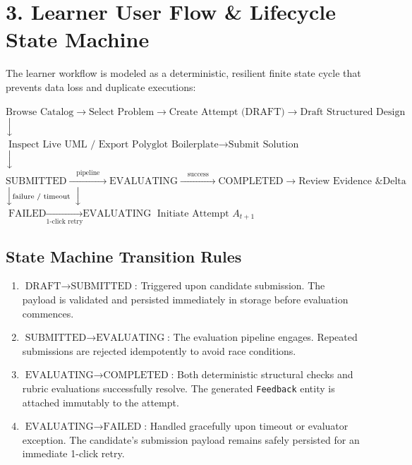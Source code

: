 \documentclass[10pt,a4paper]{article}
\begin{document}
\section{3. Learner User Flow \& Lifecycle State Machine}

The learner workflow is modeled as a deterministic, resilient finite state cycle that prevents data loss and duplicate executions:

\begin{center}
$\text{Browse Catalog} \longrightarrow \text{Select Problem} \longrightarrow \text{Create Attempt (DRAFT)} \longrightarrow \text{Draft Structured Design}$ \\[0.3em]
$\Big\downarrow$ \\[0.3em]
$\text{Inspect Live UML / Export Polyglot Boilerplate} \longrightarrow \text{Submit Solution}$ \\[0.3em]
$\Big\downarrow$ \\[0.3em]
$\boxed{\text{SUBMITTED}} \xrightarrow{\quad\text{pipeline}\quad} \boxed{\text{EVALUATING}} \xrightarrow{\quad\text{success}\quad} \boxed{\text{COMPLETED}} \longrightarrow \text{Review Evidence \& Delta}$ \\[0.3em]
$\Big\downarrow \scriptstyle{\text{failure / timeout}}$ \hspace{5.5cm} $\Big\downarrow$ \\[0.3em]
$\boxed{\text{FAILED}} \xrightarrow[\text{1-click retry}]{} \boxed{\text{EVALUATING}}$ \hspace{2.5cm} $\text{Initiate Attempt } A_{t+1}$
\end{center}

\subsection{State Machine Transition Rules}
\begin{enumerate}
  \item $\text{DRAFT} \longrightarrow \text{SUBMITTED}$: Triggered upon candidate submission. The payload is validated and persisted immediately in storage before evaluation commences.
  \item $\text{SUBMITTED} \longrightarrow \text{EVALUATING}$: The evaluation pipeline engages. Repeated submissions are rejected idempotently to avoid race conditions.
  \item $\text{EVALUATING} \longrightarrow \text{COMPLETED}$: Both deterministic structural checks and rubric evaluations successfully resolve. The generated \texttt{Feedback} entity is attached immutably to the attempt.
  \item $\text{EVALUATING} \longrightarrow \text{FAILED}$: Handled gracefully upon timeout or evaluator exception. The candidate's submission payload remains safely persisted for an immediate 1-click retry.
\end{enumerate}
\end{document}
